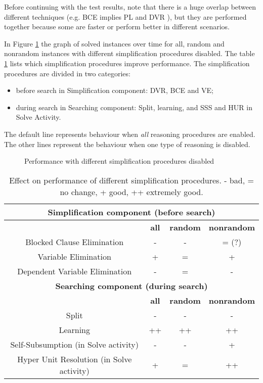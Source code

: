 Before continuing with the test results, note
that there is a huge overlap between different techniques (e.g. BCE
implies PL and DVR \cite{Jarvisalo_blockedclause}), but they are
performed together because some are faster or perform better in
different scenarios.

In Figure \ref{fig:disable} the graph of solved instances over time
for all, random and nonrandom instances with different simplification
procedures disabled. The table \ref{tbl:disable} lists which
simplification procedures improve performance. The simplification
procedures are divided in two categories:
\begin{itemize}
  \item before search in Simplification component: DVR, BCE and VE;
  \item during search in Searching component: Split, learning, and SSS and HUR in
  Solve Activity.
\end{itemize}

The default line represents behaviour when \emph{all} reasoning
procedures are enabled. The other lines represent the behaviour
when one type of reasoning is disabled.

\begin{figure}
  \centering
  \caption{Performance with different simplification procedures disabled}
  \label{fig:disable}
\end{figure}

\begin{table}
  \centering
  \begin{tabular}{| c | c | c | c |}
    \hline
    \multicolumn{4}{|c|}{\textbf{Simplification component (before search)}} \\
    \hline
    & \textbf{all} & \textbf{random} & \textbf{nonrandom} \\
    \hline
    Blocked Clause Elimination & - & - & = (?) \\
    Variable Elimination & + & = & + \\
    Dependent Variable Elimination & - & = & - \\
    \hline
    \hline
    \multicolumn{4}{|c|}{\textbf{Searching component (during search)}} \\
    \hline
    & \textbf{all} & \textbf{random} & \textbf{nonrandom} \\
    \hline
    Split & - & - & - \\
    Learning & ++ & ++ & ++ \\
    Self-Subsumption (in Solve activity) & - & - & + \\
    Hyper Unit Resolution (in Solve activity) & + & = & ++ \\
    \hline
  \end{tabular}

  \caption{Effect on performance of different simplification procedures.
  - bad, = no change, + good, ++ extremely good.}
  \label{tbl:disable}
\end{table}

